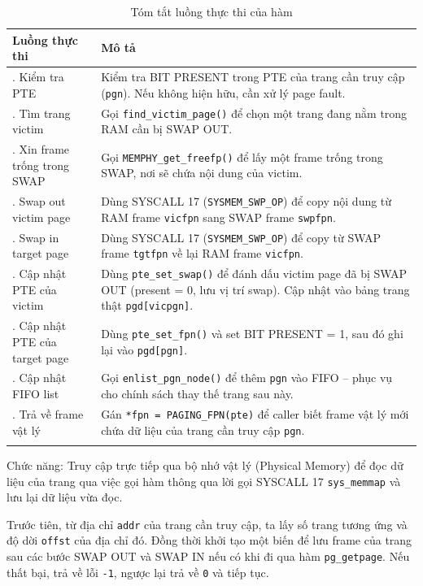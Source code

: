 \begin{center}
\centering
\renewcommand{\arraystretch}{1}
\begin{longtable}{|>{\raggedright\arraybackslash}p{4cm}|>{\raggedright\arraybackslash}p{10cm}|}
\hline
\textbf{Luồng thực thi} & \textbf{Mô tả} \\
\hline 
1. Kiểm tra PTE & Kiểm tra BIT PRESENT trong PTE của trang cần truy cập (\texttt{pgn}). Nếu không hiện hữu, cần xử lý page fault.\\
\hline 
2. Tìm trang victim & Gọi \texttt{find\_victim\_page()} để chọn một trang đang nằm trong RAM cần bị SWAP OUT.\\
\hline
3. Xin frame trống trong SWAP & Gọi \texttt{MEMPHY\_get\_freefp()} để lấy một frame trống trong SWAP, nơi sẽ chứa nội dung của victim.\\
\hline
4. Swap out victim page	& Dùng SYSCALL 17 (\texttt{SYSMEM\_SWP\_OP}) để copy nội dung từ RAM frame \texttt{vicfpn} sang SWAP frame \texttt{swpfpn}.\\
\hline
5. Swap in target page & Dùng SYSCALL 17 (\texttt{SYSMEM\_SWP\_OP}) để copy từ SWAP frame \texttt{tgtfpn} về lại RAM frame \texttt{vicfpn}.\\
\hline
6. Cập nhật PTE của victim & Dùng \texttt{pte\_set\_swap()} để đánh dấu victim page đã bị SWAP OUT (present = 0, lưu vị trí swap). Cập nhật vào bảng trang thật \texttt{pgd[vicpgn]}.\\
\hline
7. Cập nhật PTE của target page	& Dùng \texttt{pte\_set\_fpn()} và set BIT PRESENT = 1, sau đó ghi lại vào \texttt{pgd[pgn]}.\\
\hline
8. Cập nhật FIFO list & Gọi \texttt{enlist\_pgn\_node()} để thêm \texttt{pgn} vào FIFO -- phục vụ cho chính sách thay thế trang sau này.\\
\hline
9. Trả về frame vật lý & Gán \texttt{*fpn = PAGING\_FPN(pte)} để caller biết frame vật lý mới chứa dữ liệu của trang cần truy cập \texttt{pgn}.\\
\hline
\caption{\label{table2}Tóm tắt luồng thực thi của hàm}
\end{longtable}
\end{center}


Chức năng: Truy cập trực tiếp qua bộ nhớ vật lý (Physical Memory) để đọc dữ liệu của trang qua việc gọi hàm thông qua lời gọi SYSCALL 17 \texttt{sys\_memmap} và lưu lại dữ liệu vừa đọc.

Trước tiên, từ địa chỉ \texttt{addr} của trang cần truy cập, ta lấy số trang tương ứng và độ dời \texttt{offst} của địa chỉ đó. Đồng thời khởi tạo một biến để lưu frame của trang sau các bước SWAP OUT và SWAP IN nếu có khi đi qua hàm \texttt{pg\_getpage}. Nếu thất bại, trả về lỗi \texttt{-1}, ngược lại trả về \texttt{0} và tiếp tục.

